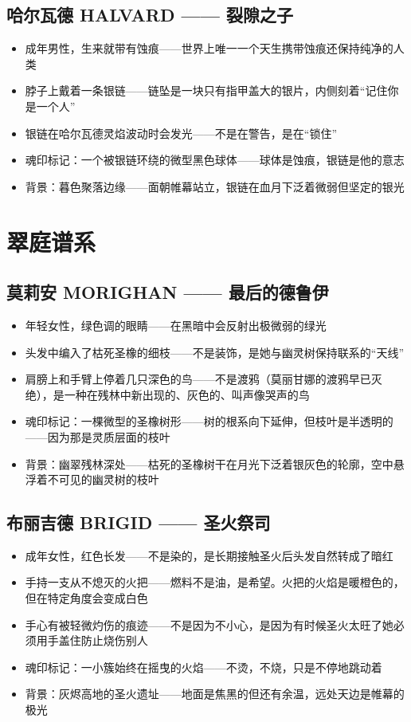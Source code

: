 \documentclass[12pt,a4paper,openany]{ctexbook}
\begin{document}
\subsection{哈尔瓦德 HALVARD —— 裂隙之子}
\begin{itemize}
    \item 成年男性，生来就带有蚀痕——世界上唯一一个天生携带蚀痕还保持纯净的人类
    \item 脖子上戴着一条银链——链坠是一块只有指甲盖大的银片，内侧刻着“记住你是一个人”
    \item 银链在哈尔瓦德灵焰波动时会发光——不是在警告，是在“锁住”
    \item 魂印标记：一个被银链环绕的微型黑色球体——球体是蚀痕，银链是他的意志
    \item 背景：暮色聚落边缘——面朝帷幕站立，银链在血月下泛着微弱但坚定的银光
\end{itemize}

\section{翠庭谱系}

\subsection{莫莉安 MORIGHAN —— 最后的德鲁伊}
\begin{itemize}
    \item 年轻女性，绿色调的眼睛——在黑暗中会反射出极微弱的绿光
    \item 头发中编入了枯死圣橡的细枝——不是装饰，是她与幽灵树保持联系的“天线”
    \item 肩膀上和手臂上停着几只深色的鸟——不是渡鸦（莫丽甘娜的渡鸦早已灭绝），是一种在残林中新出现的、灰色的、叫声像哭声的鸟
    \item 魂印标记：一棵微型的圣橡树形——树的根系向下延伸，但枝叶是半透明的——因为那是灵质层面的枝叶
    \item 背景：幽翠残林深处——枯死的圣橡树干在月光下泛着银灰色的轮廓，空中悬浮着不可见的幽灵树的枝叶
\end{itemize}

\subsection{布丽吉德 BRIGID —— 圣火祭司}
\begin{itemize}
    \item 成年女性，红色长发——不是染的，是长期接触圣火后头发自然转成了暗红
    \item 手持一支从不熄灭的火把——燃料不是油，是希望。火把的火焰是暖橙色的，但在特定角度会变成白色
    \item 手心有被轻微灼伤的痕迹——不是因为不小心，是因为有时候圣火太旺了她必须用手盖住防止烧伤别人
    \item 魂印标记：一小簇始终在摇曳的火焰——不烫，不烧，只是不停地跳动着
    \item 背景：灰烬高地的圣火遗址——地面是焦黑的但还有余温，远处天边是帷幕的极光
\end{itemize}
\end{document}
